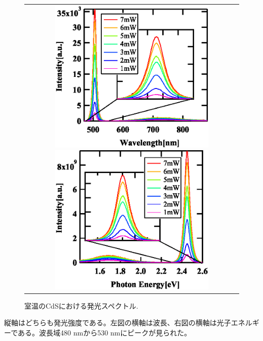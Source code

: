 \documentclass[11pt,a4j]{jsarticle}
\begin{document}
\begin{figure}[ht]
 \centering
 \begin{tabular}{c}

  \begin{minipage}{0.5\hsize}

   \includegraphics[clip,width=8cm]{start2_CdS_rt_Spectrum_wav.eps}
  \end{minipage}

  \begin{minipage}{0.06\hsize}%
    \hspace{5mm}
  \end{minipage}

  \begin{minipage}{0.5\hsize}
   \centering
   \includegraphics[clip,width=8cm]{start2_CdS_rt_Spectrum_eV.eps}
  \end{minipage}
 \end{tabular}
 \caption{室温のCdSにおける発光スペクトル.}
 \label{fig_cds_rt_spec1}

\end{figure}

縦軸はどちらも発光強度である。左図の横軸は波長、右図の横軸は光子エネルギーである。波長域480 nmから530 nmにピークが見られた。
%
\end{document}
